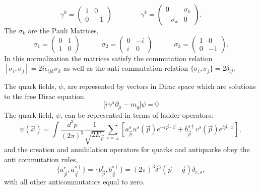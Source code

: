 \begin{equation*}
\gamma^0 = \begin{pmatrix}
1 & 0 \\
0 & -1 
\end{pmatrix}
\qquad \qquad
\gamma^k = \begin{pmatrix}
0 & \sigma_k \\
-\sigma_k & 0
\end{pmatrix}.
\end{equation*}
The $\sigma_k$ are the Pauli Matrices,  
\begin{equation*}
\sigma_1 = \begin{pmatrix}0 & 1 \\ 1 & 0\end{pmatrix} \qquad \quad
\sigma_2 = \begin{pmatrix}0 & -i \\ i & 0\end{pmatrix} \qquad \quad
\sigma_3 = \begin{pmatrix}1 & 0 \\ 0 & -1\end{pmatrix}.
\end{equation*}
In this normalization the matrices satisfy the commutation relation $\left[ \sigma_i , \sigma_j \right] = 2i \epsilon_{ijk} \sigma_k $ as well as the anti-commutation relation $\{ \sigma_i , \sigma_j \} =  2\delta_{ij}$.

The quark fields, $\psi$, are represented by vectors in Dirac space which are solutions to the free Dirac equation. 
\begin{equation*}
\big[ i \gamma^\mu \partial_\mu - m_q \big] \psi= 0 
\end{equation*}
The quark field, $\psi$, can be represented in terms of ladder operators: 
\begin{equation*}
\psi(\vec{x}) = \int \frac{d^3p}{(2\pi)^3} \frac{1}{\sqrt{2E_{\vec{p}}}}\sum_{s=\pm}\left[ a^s_{\vec{p}} u^s(\vec{p}) e^{-i\vec{p}\cdot \vec{x}} + b^{s\dagger}_{\vec{p}} v^s(\vec{p}) e^{i\vec{p}\cdot \vec{x}}\right],
\end{equation*}
and the creation and annihilation operators for quarks and antiquarks obey the anti commutation rules, 
\begin{equation*}
\{a_{\vec{p}}^r , a_{\vec{q}}^{s\dagger}\} = \{b_{\vec{p}}^r , b_{\vec{q}}^{s\dagger}\} = (2\pi)^3 \delta^3(\vec{p}-\vec{q})\delta_{r,s}, 
\end{equation*}
with all other anticommutators equal to zero. 

